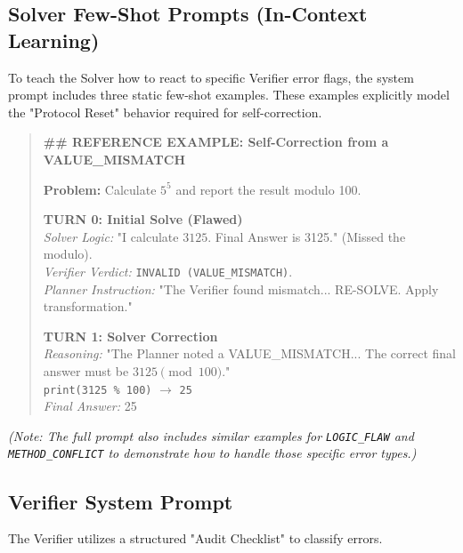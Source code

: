 \documentclass{article}
\begin{document}
\subsection{Solver Few-Shot Prompts (In-Context Learning)}
To teach the Solver how to react to specific Verifier error flags, the system prompt includes three static few-shot examples. These examples explicitly model the "Protocol Reset" behavior required for self-correction.

\begin{quote}
\small
\textbf{\#\# REFERENCE EXAMPLE: Self-Correction from a VALUE\_MISMATCH}

\textbf{Problem:} Calculate $5^{5}$ and report the result modulo 100.

\textbf{TURN 0: Initial Solve (Flawed)} \\
\textit{Solver Logic:} "I calculate $3125$. Final Answer is 3125." (Missed the modulo). \\
\textit{Verifier Verdict:} \texttt{INVALID (VALUE\_MISMATCH)}. \\
\textit{Planner Instruction:} "The Verifier found mismatch... RE-SOLVE. Apply transformation."

\textbf{TURN 1: Solver Correction} \\
\textit{Reasoning:} "The Planner noted a VALUE\_MISMATCH... The correct final answer must be $3125 \pmod{100}$." \\
\texttt{print(3125 \% 100)} $\to$ \texttt{25} \\
\textit{Final Answer:} 25
\end{quote}

\textit{(Note: The full prompt also includes similar examples for \texttt{LOGIC\_FLAW} and \texttt{METHOD\_CONFLICT} to demonstrate how to handle those specific error types.)}

\subsection{Verifier System Prompt}
The Verifier utilizes a structured "Audit Checklist" to classify errors.
\end{document}
